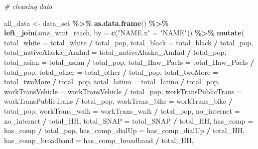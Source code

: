 \documentclass[
]{article}
\newenvironment{Shaded}{\begin{snugshade}}{\end{snugshade}}
\newcommand{\CommentTok}[1]{\textcolor[rgb]{0.56,0.35,0.01}{\textit{#1}}}
\newcommand{\DataTypeTok}[1]{\textcolor[rgb]{0.13,0.29,0.53}{#1}}
\newcommand{\KeywordTok}[1]{\textcolor[rgb]{0.13,0.29,0.53}{\textbf{#1}}}
\newcommand{\NormalTok}[1]{#1}
\newcommand{\OperatorTok}[1]{\textcolor[rgb]{0.81,0.36,0.00}{\textbf{#1}}}
\newcommand{\StringTok}[1]{\textcolor[rgb]{0.31,0.60,0.02}{#1}}
\begin{document}
\begin{Shaded}
\begin{Highlighting}[]
\CommentTok{\# cleaning data}

\NormalTok{all\_data \textless{}{-}}\StringTok{ }
\StringTok{  }\NormalTok{data\_set }\OperatorTok{\%\textgreater{}\%}\StringTok{ }
\StringTok{  }\KeywordTok{as.data.frame}\NormalTok{() }\OperatorTok{\%\textgreater{}\%}\StringTok{ }
\StringTok{  }\KeywordTok{left\_join}\NormalTok{(amz\_wmt\_reach, }\DataTypeTok{by =} \KeywordTok{c}\NormalTok{(}\StringTok{"NAME.x"}\NormalTok{ =}\StringTok{ "NAME"}\NormalTok{)) }\OperatorTok{\%\textgreater{}\%}\StringTok{ }
\StringTok{  }\KeywordTok{mutate}\NormalTok{(}
    \DataTypeTok{total\_white =}\NormalTok{ total\_white }\OperatorTok{/}\StringTok{ }\NormalTok{total\_pop, }
    \DataTypeTok{total\_black =}\NormalTok{ total\_black }\OperatorTok{/}\StringTok{ }\NormalTok{total\_pop, }
    \DataTypeTok{total\_nativeAlaska\_AmInd =}\NormalTok{ total\_nativeAlaska\_AmInd }\OperatorTok{/}\StringTok{ }\NormalTok{total\_pop, }
    \DataTypeTok{total\_asian =}\NormalTok{ total\_asian }\OperatorTok{/}\StringTok{ }\NormalTok{total\_pop, }
    \DataTypeTok{total\_Haw\_PacIs =}\NormalTok{ total\_Haw\_PacIs }\OperatorTok{/}\StringTok{ }\NormalTok{total\_pop, }
    \DataTypeTok{total\_other =}\NormalTok{ total\_other }\OperatorTok{/}\StringTok{ }\NormalTok{total\_pop, }
    \DataTypeTok{total\_twoMore =}\NormalTok{ total\_twoMore }\OperatorTok{/}\StringTok{ }\NormalTok{total\_pop, }
    \DataTypeTok{total\_latino =}\NormalTok{ total\_latino }\OperatorTok{/}\StringTok{ }\NormalTok{total\_pop, }
    \DataTypeTok{workTransVehicle =}\NormalTok{ workTransVehicle }\OperatorTok{/}\StringTok{ }\NormalTok{total\_pop, }
    \DataTypeTok{workTransPublicTrans =}\NormalTok{ workTransPublicTrans }\OperatorTok{/}\StringTok{ }\NormalTok{total\_pop, }
    \DataTypeTok{workTrans\_bike =}\NormalTok{ workTrans\_bike }\OperatorTok{/}\StringTok{ }\NormalTok{total\_pop, }
    \DataTypeTok{workTrans\_walk =}\NormalTok{ workTrans\_walk }\OperatorTok{/}\StringTok{ }\NormalTok{total\_pop, }
    \DataTypeTok{no\_internet =}\NormalTok{ no\_internet }\OperatorTok{/}\StringTok{ }\NormalTok{total\_HH, }
    \DataTypeTok{total\_SNAP =}\NormalTok{ total\_SNAP }\OperatorTok{/}\StringTok{ }\NormalTok{total\_HH, }
    \DataTypeTok{has\_comp =}\NormalTok{ has\_comp }\OperatorTok{/}\StringTok{ }\NormalTok{total\_pop, }
    \DataTypeTok{has\_comp\_dialUp =}\NormalTok{ has\_comp\_dialUp }\OperatorTok{/}\StringTok{ }\NormalTok{total\_HH, }
    \DataTypeTok{has\_comp\_broadband =}\NormalTok{ has\_comp\_broadband }\OperatorTok{/}\StringTok{ }\NormalTok{total\_HH, }

\end{Highlighting}
\end{Shaded}
\end{document}
